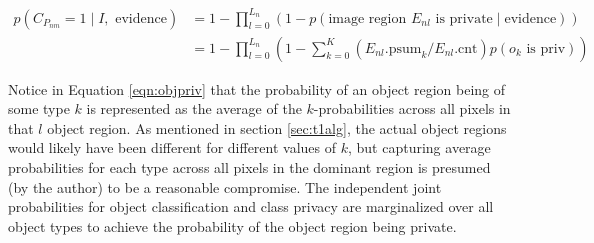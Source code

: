 \documentclass[11pt]{article}
\begin{document}
\begin{align}\label{eqn:task2.0}
    p(C_{P_{nm}} = 1 \mid I, \textrm{ evidence}) & = 1 - \prod_{l = 0}^{L_n} \left( 1 - p(\textrm{image region $E_{nl}$ 
        is private} \mid \textrm{evidence}) \right)\\
    & = 1 - \prod_{l = 0}^{L_n} \left( 1 - \sum_{k=0}^{K} (E_{nl}\textrm{.psum}_k / E_{nl}\textrm{.cnt}) p(o_k \textrm{ is priv}) \right) \label{eqn:objpriv}
\end{align}

Notice in Equation \ref{eqn:objpriv} that the probability of an object region being of some type $k$ is represented as the average of the $k$-probabilities across all pixels in that $l$ object region.  As mentioned in section \ref{sec:t1alg}, the actual object regions would likely have been different for different values of $k$, but capturing average probabilities for each type across all pixels in the dominant region is presumed (by the author) to be a reasonable compromise.  The independent joint probabilities for object classification and class privacy are marginalized over all object types to achieve the probability of the object region being private.



 




\newpage


\end{document}
